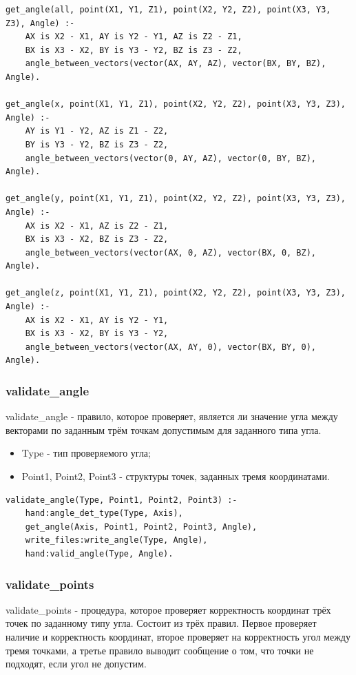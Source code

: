 \begin{lstlisting}[caption=Реализация правила get\_angle, label=rules:getangle]
get_angle(all, point(X1, Y1, Z1), point(X2, Y2, Z2), point(X3, Y3, Z3), Angle) :-
	AX is X2 - X1, AY is Y2 - Y1, AZ is Z2 - Z1,
	BX is X3 - X2, BY is Y3 - Y2, BZ is Z3 - Z2,
	angle_between_vectors(vector(AX, AY, AZ), vector(BX, BY, BZ), Angle).
	
get_angle(x, point(X1, Y1, Z1), point(X2, Y2, Z2), point(X3, Y3, Z3), Angle) :-
	AY is Y1 - Y2, AZ is Z1 - Z2,
	BY is Y3 - Y2, BZ is Z3 - Z2,
	angle_between_vectors(vector(0, AY, AZ), vector(0, BY, BZ), Angle).
	
get_angle(y, point(X1, Y1, Z1), point(X2, Y2, Z2), point(X3, Y3, Z3), Angle) :-
	AX is X2 - X1, AZ is Z2 - Z1,
	BX is X3 - X2, BZ is Z3 - Z2,
	angle_between_vectors(vector(AX, 0, AZ), vector(BX, 0, BZ), Angle).
	
get_angle(z, point(X1, Y1, Z1), point(X2, Y2, Z2), point(X3, Y3, Z3), Angle) :-
	AX is X2 - X1, AY is Y2 - Y1,
	BX is X3 - X2, BY is Y3 - Y2,
	angle_between_vectors(vector(AX, AY, 0), vector(BX, BY, 0), Angle).
\end{lstlisting}


\subsubsection{validate\_angle}
\hspace{0.6cm} validate\_angle - правило, которое проверяет, является ли значение угла между векторами по заданным трём точкам допустимым для заданного типа угла.

\begin{itemize}
	\item Type - тип проверяемого угла;
	\item Point1, Point2, Point3 - структуры точек, заданных тремя координатами.
\end{itemize}

\begin{lstlisting}[caption=Реализация правила validate\_angle, label=rules:validateangle]
validate_angle(Type, Point1, Point2, Point3) :-
	hand:angle_det_type(Type, Axis),
	get_angle(Axis, Point1, Point2, Point3, Angle),
	write_files:write_angle(Type, Angle),
	hand:valid_angle(Type, Angle).
\end{lstlisting}

\subsubsection{validate\_points}
\hspace{0.6cm} validate\_points - процедура, которое проверяет корректность координат трёх точек по заданному типу угла. Состоит из трёх правил. Первое проверяет наличие и корректность координат, второе проверяет на корректность угол между тремя точками, а третье правило выводит сообщение о том, что точки не подходят, если угол не допустим.

